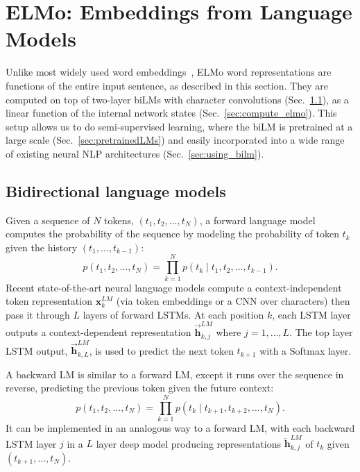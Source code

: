 \documentclass[11pt,a4paper]{article}
\newcommand{\ELMO}{ELMo}
\begin{document}
\section{\ELMO: Embeddings from Language Models}
\label{sec:elmo}

Unlike most widely used word embeddings~\citep{Pennington2014GloveGV}, \ELMO{} word representations are functions of the entire input sentence, as described in this section. They are computed on top of two-layer biLMs with character convolutions (Sec.~\ref{sec:bilm_def}), as a linear function of the internal network states (Sec.~\ref{sec:compute_elmo}). This setup allows us to do semi-supervised learning, where the biLM is pretrained at a large scale (Sec.~\ref{sec:pretrainedLMs}) and easily incorporated into a wide range of existing neural NLP architectures (Sec.~\ref{sec:using_bilm}). 

\subsection{Bidirectional language models}
\label{sec:bilm_def}
Given a sequence of $N$ tokens, $(t_1, t_2, ..., t_N)$, a forward language model computes the probability of the sequence
by modeling the probability of token $t_k$ given the history $(t_1, ..., t_{k-1})$:
\[
p(t_1, t_2, \ldots, t_N) = \prod_{k=1}^N p({t_k} \mid t_1, t_2, \ldots, t_{k-1}).
\]
Recent state-of-the-art neural language models \citep{Jzefowicz2016ExploringTL,Melis2017OnTS,Merity2017RegularizingAO}
compute a context-independent token representation $\mathbf{x}^{LM}_{k}$
(via token embeddings or a CNN over characters) then pass it through $L$ layers of forward LSTMs.
At each position $k$, each LSTM layer outputs a context-dependent representation $\overrightarrow{\mathbf{h}}^{LM}_{k,j}$ where $j=1, \ldots, L$.
The top layer LSTM output, $\overrightarrow{\mathbf{h}}^{LM}_{k,L}$, is used to predict the next token $t_{k+1}$ with a Softmax layer.

A backward LM is similar to a forward LM, except it runs over the sequence in reverse, predicting the previous token given the future context: 
\[
p(t_1, t_2, \ldots, t_N) = \prod_{k=1}^N p(t_k \mid t_{k+1}, t_{k+2}, \ldots, t_N).
\]
It can be implemented in an analogous way to a forward LM, with each backward LSTM layer $j$ in a $L$ layer deep model producing
representations $\overleftarrow{\mathbf{h}}^{LM}_{k,j}$ of $t_k$ given $(t_{k+1}, \ldots, t_N)$.
\end{document}
